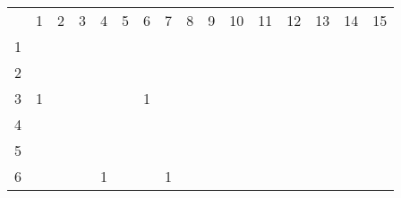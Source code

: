 \documentclass[a4paper]{exam}
\begin{document}
\begin{enumerate}
\begin{itemize}
		\begin{table}[H]
			\centering
			\begin{tabular}{cccccccccccccccc}
				& 1 & 2 & 3 & 4 & 5 & 6 & 7 & 8 & 9 & 10 & 11 & 12 & 13 & 14 & 15 \\ \cline{2-16} 
				\multicolumn{1}{c|}{1} & \multicolumn{1}{c|}{} & \multicolumn{1}{c|}{} & \multicolumn{1}{c|}{} & \multicolumn{1}{c|}{} & \multicolumn{1}{c|}{} & \multicolumn{1}{c|}{} & \multicolumn{1}{c|}{} & \multicolumn{1}{c|}{} & \multicolumn{1}{c|}{} & \multicolumn{1}{c|}{} & \multicolumn{1}{c|}{} & \multicolumn{1}{c|}{} & \multicolumn{1}{c|}{} & \multicolumn{1}{c|}{} & \multicolumn{1}{c|}{} \\ \cline{2-16} 
				\multicolumn{1}{c|}{2} & \multicolumn{1}{c|}{} & \multicolumn{1}{c|}{} & \multicolumn{1}{c|}{} & \multicolumn{1}{c|}{} & \multicolumn{1}{c|}{} & \multicolumn{1}{c|}{} & \multicolumn{1}{c|}{} & \multicolumn{1}{c|}{} & \multicolumn{1}{c|}{} & \multicolumn{1}{c|}{} & \multicolumn{1}{c|}{} & \multicolumn{1}{c|}{} & \multicolumn{1}{c|}{} & \multicolumn{1}{c|}{} & \multicolumn{1}{c|}{} \\ \cline{2-16} 
				\multicolumn{1}{c|}{3} & \multicolumn{1}{c|}{1} & \multicolumn{1}{c|}{} & \multicolumn{1}{c|}{} & \multicolumn{1}{c|}{} & \multicolumn{1}{c|}{} & \multicolumn{1}{c|}{1} & \multicolumn{1}{c|}{} & \multicolumn{1}{c|}{} & \multicolumn{1}{c|}{} & \multicolumn{1}{c|}{} & \multicolumn{1}{c|}{} & \multicolumn{1}{c|}{} & \multicolumn{1}{c|}{} & \multicolumn{1}{c|}{} & \multicolumn{1}{c|}{} \\ \cline{2-16} 
				\multicolumn{1}{c|}{4} & \multicolumn{1}{c|}{} & \multicolumn{1}{c|}{} & \multicolumn{1}{c|}{} & \multicolumn{1}{c|}{} & \multicolumn{1}{c|}{} & \multicolumn{1}{c|}{} & \multicolumn{1}{c|}{} & \multicolumn{1}{c|}{} & \multicolumn{1}{c|}{} & \multicolumn{1}{c|}{} & \multicolumn{1}{c|}{} & \multicolumn{1}{c|}{} & \multicolumn{1}{c|}{} & \multicolumn{1}{c|}{} & \multicolumn{1}{c|}{} \\ \cline{2-16} 
				\multicolumn{1}{c|}{5} & \multicolumn{1}{c|}{} & \multicolumn{1}{c|}{} & \multicolumn{1}{c|}{} & \multicolumn{1}{c|}{} & \multicolumn{1}{c|}{} & \multicolumn{1}{c|}{} & \multicolumn{1}{c|}{} & \multicolumn{1}{c|}{} & \multicolumn{1}{c|}{} & \multicolumn{1}{c|}{} & \multicolumn{1}{c|}{} & \multicolumn{1}{c|}{} & \multicolumn{1}{c|}{} & \multicolumn{1}{c|}{} & \multicolumn{1}{c|}{} \\ \cline{2-16} 
				\multicolumn{1}{c|}{6} & \multicolumn{1}{c|}{} & \multicolumn{1}{c|}{} & \multicolumn{1}{c|}{} & \multicolumn{1}{c|}{1} & \multicolumn{1}{c|}{} & \multicolumn{1}{c|}{} & \multicolumn{1}{c|}{1} & \multicolumn{1}{c|}{} & \multicolumn{1}{c|}{} & \multicolumn{1}{c|}{} & \multicolumn{1}{c|}{} & \multicolumn{1}{c|}{} & \multicolumn{1}{c|}{} & \multicolumn{1}{c|}{} & \multicolumn{1}{c|}{} \\ \cline{2-16} 

\end{tabular}
\end{table}
\end{itemize}
\end{enumerate}
\end{document}
